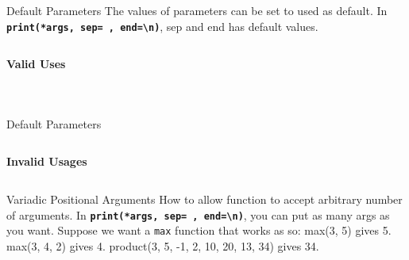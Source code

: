         \begin{frame}{Default Parameters}
            The values of parameters can be set to used as default.
            \newline
            In \textbf{\texttt{print(*args, sep=\textquotesingle \ \textquotesingle, end=\textquotesingle \textbackslash n\textquotesingle )}}, 
            sep and end has default values.
            \pause
            \inputminted[frame=single,framesep=2pt, lastline=15]{python3}{code-examples/default.py}
            \textbf{Valid Uses}
            \begin{columns}
                \begin{column}{0.50\textwidth}
                    \pause
                    \inputminted[frame=single,framesep=2pt, lastline=15]{python3}{code-examples/valid1.py}  
                \end{column}
                \begin{column}{0.50\textwidth}
                    \pause
                    \inputminted[frame=single,framesep=2pt, lastline=15]{python3}{code-examples/valid1_1.py}                    
                \end{column}
            \end{columns}
        \end{frame}

        \begin{frame}{Default Parameters}
            \LARGE
            \inputminted[frame=single,framesep=2pt, lastline=15]{python3}{code-examples/default.py}
            \pause
            \textbf{Invalid Usages}
            \inputminted[frame=single,framesep=2pt, lastline=15]{python3}{code-examples/valid2.py}  
        \end{frame}

        \begin{frame}{Variadic Positional Arguments}
            \pause
            \LARGE
            How to allow function to accept arbitrary number of arguments.
            \newline
            In \textbf{\texttt{print(*args, sep=\textquotesingle \ \textquotesingle, end=\textquotesingle \textbackslash n\textquotesingle )}}, 
            you can put as many args as you want.
            \pause
            \newline 
            \newline Suppose we want a \texttt{max} function that works as so:
            \newline max(3, 5) gives 5.
            \newline max(3, 4, 2) gives 4.
            \newline product(3, 5, -1, 2, 10, 20, 13, 34) gives 34.
            \newline 
            \pause
            \inputminted[frame=single,framesep=2pt]{python3}{code-examples/variadic.py}
        \end{frame}


